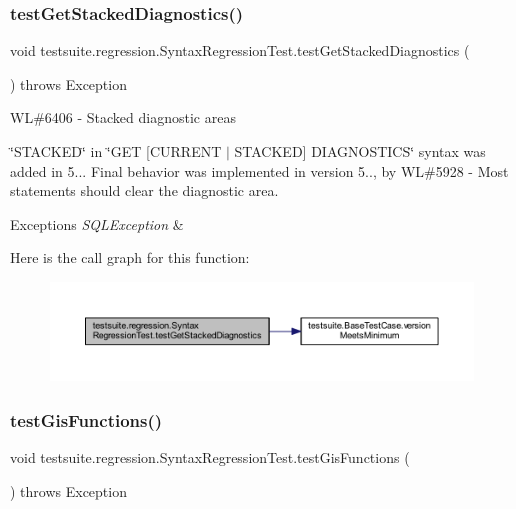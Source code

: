 \subsubsection{\texorpdfstring{test\+Get\+Stacked\+Diagnostics()}{testGetStackedDiagnostics()}}
{\footnotesize\ttfamily void testsuite.\+regression.\+Syntax\+Regression\+Test.\+test\+Get\+Stacked\+Diagnostics (\begin{DoxyParamCaption}{ }\end{DoxyParamCaption}) throws Exception}

WL\#6406 -\/ Stacked diagnostic areas

\char`\"{}\+S\+T\+A\+C\+K\+E\+D\char`\"{} in \char`\"{}\+G\+E\+T \mbox{[}\+C\+U\+R\+R\+E\+N\+T $\vert$ S\+T\+A\+C\+K\+E\+D\mbox{]} D\+I\+A\+G\+N\+O\+S\+T\+I\+C\+S\char`\"{} syntax was added in 5... Final behavior was implemented in version 5.., by WL\#5928 -\/ Most statements should clear the diagnostic area.


\begin{DoxyExceptions}{Exceptions}
{\em S\+Q\+L\+Exception} & \\
\hline
\end{DoxyExceptions}
Here is the call graph for this function\+:
\nopagebreak
\begin{figure}[H]
\begin{center}
\leavevmode
\includegraphics[width=350pt]{classtestsuite_1_1regression_1_1_syntax_regression_test_a1bf8ec597fe6c78a3e994f1695fbca2b_cgraph}
\end{center}
\end{figure}
\mbox{\label{classtestsuite_1_1regression_1_1_syntax_regression_test_a5093357371fd3056075bdda8c5853c9f}} 
\subsubsection{\texorpdfstring{test\+Gis\+Functions()}{testGisFunctions()}}
{\footnotesize\ttfamily void testsuite.\+regression.\+Syntax\+Regression\+Test.\+test\+Gis\+Functions (\begin{DoxyParamCaption}{ }\end{DoxyParamCaption}) throws Exception}

